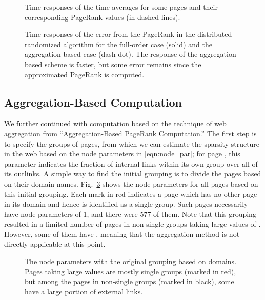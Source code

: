 \documentclass[11pt,draftcls,onecolumn]{IEEEtran}
\newcommand{\fig}[3]{\resizebox{#1}{#2}{\texttt{[image: \#3]}}}
\begin{document}
\begin{table}[t]
\begin{figure}[t]
  \centering
  \fig{9cm}{!}{timeresp_alpha02a.eps}
  \caption{Time responses of the time averages  for some pages and
       their corresponding PageRank values (in dashed lines).}
  \label{fig:timeresp_y}
\end{figure}


\begin{figure}[t]
  \centering
  \fig{9cm}{!}{timeresp_err_alpha02_full_agg.eps}
  \caption{Time responses of the error from the PageRank  in the distributed randomized algorithm 
             for the full-order case (solid) and the aggregation-based case (dash-dot).
             The response of the aggregation-based scheme is faster, but some error remains
             since the approximated PageRank  is computed.}
  \label{fig:timeresp_err1}
\end{figure}

\subsection*{Aggregation-Based Computation}

We further continued with computation based on the technique of web aggregation
from ``Aggregation-Based PageRank Computation.''
The first step is to specify the groups of pages, from which we can estimate the 
sparsity structure in the web based on the node parameters  in \eqref{eqn:node_par}; 
for page , this parameter  
indicates the fraction of internal links within its own group over all of its outlinks. 
A simple way to find the initial grouping is to divide the pages based on their domain names.
Fig.~\ref{fig:delta_i_1} shows the node parameters for all pages based on this initial grouping. 
Each mark in red indicates a page which has no other page in its domain and 
hence is identified as a single group. Such pages necessarily have node parameters of 1, and
there were 577 of them. 
Note that this grouping resulted in a limited 
number of pages in non-single groups taking large values of . 
However, some of them have , meaning that the aggregation method is not
directly applicable at this point. 

\begin{figure}[t]
  \centering
  \fig{9cm}{!}{delta_i_1.eps}
  \caption{The node parameters  with the original grouping based on domains.
           Pages taking large values are mostly single groups (marked in red), 
           but among the pages in non-single groups (marked in black), some have 
           a large portion of external links.}
  \label{fig:delta_i_1}
\end{figure}



\end{table}
\end{document}
